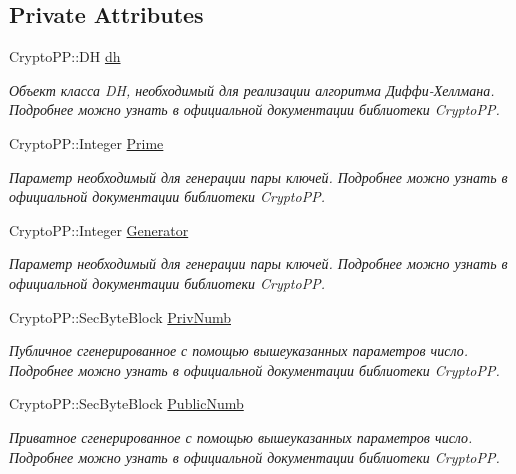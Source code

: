 \subsection*{Private Attributes}
\begin{DoxyCompactItemize}
\item 
Crypto\+P\+P\+::\+DH \hyperlink{class_client_window_a70e338edd34ee5043c35c03c6da85190}{dh}
\begin{DoxyCompactList}\small\item\em Объект класса DH, необходимый для реализации алгоритма Диффи-\/Хеллмана. Подробнее можно узнать в официальной документации библиотеки Crypto\+PP. \end{DoxyCompactList}\item 
Crypto\+P\+P\+::\+Integer \hyperlink{class_client_window_aab318f5417f89201dc6633b2e481e817}{Prime}
\begin{DoxyCompactList}\small\item\em Параметр необходимый для генерации пары ключей. Подробнее можно узнать в официальной документации библиотеки Crypto\+PP. \end{DoxyCompactList}\item 
Crypto\+P\+P\+::\+Integer \hyperlink{class_client_window_a72c4ff89452aba7e047970ad83c51369}{Generator}
\begin{DoxyCompactList}\small\item\em Параметр необходимый для генерации пары ключей. Подробнее можно узнать в официальной документации библиотеки Crypto\+PP. \end{DoxyCompactList}\item 
Crypto\+P\+P\+::\+Sec\+Byte\+Block \hyperlink{class_client_window_a4c4248eb0be6db957bbd835146e36699}{Priv\+Numb}
\begin{DoxyCompactList}\small\item\em Публичное сгенерированное с помощью вышеуказанных параметров число. Подробнее можно узнать в официальной документации библиотеки Crypto\+PP. \end{DoxyCompactList}\item 
Crypto\+P\+P\+::\+Sec\+Byte\+Block \hyperlink{class_client_window_a213087869fc5bfb7427add5248e60046}{Public\+Numb}
\begin{DoxyCompactList}\small\item\em Приватное сгенерированное с помощью вышеуказанных параметров число. Подробнее можно узнать в официальной документации библиотеки Crypto\+PP. \end{DoxyCompactList}\item 

\end{DoxyCompactItemize}
